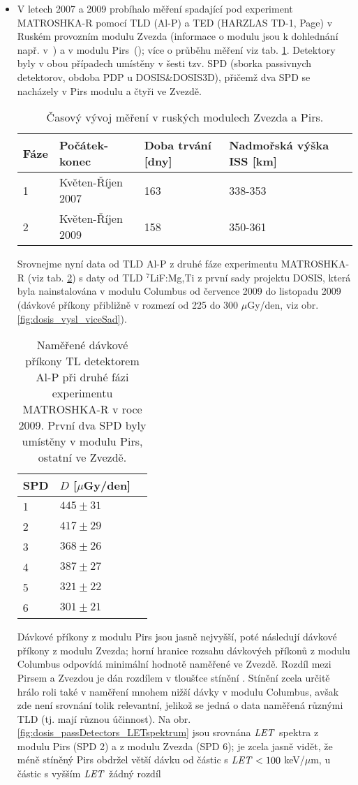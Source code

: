 \begin{itemize}
\item V letech 2007 a 2009 probíhalo měření spadající pod experiment MATROSHKA-R pomocí TLD (Al-P) a TED (HARZLAS TD-1, Page) v Ruském provozním modulu Zvezda (informace o modulu jsou k dohlednání např. v~\cite{serviceModule}) a v modulu Pirs~(\cite{piers1}); více o průběhu měření viz tab. \ref{tab:dosis_passDetectors_timeline}. Detektory byly v obou případech umístěny v šesti tzv. SPD (sborka passivnych detektorov, obdoba PDP u DOSIS\&DOSIS3D), přičemž dva SPD se nacházely v Pirs modulu a čtyři ve Zvezdě. 
\begin{table}[h]
  \centering
  \caption{Časový vývoj měření v ruských modulech Zvezda a Pirs. \cite{passDetectors}}
  \label{tab:dosis_passDetectors_timeline}
  \begin{tabular}{llll}
	\toprule
	Fáze&Počátek-konec&Doba trvání [dny]&Nadmořská výška ISS [km]\\
	\midrule
	1&Květen-Říjen 2007&163&338-353\\
	2&Květen-Říjen 2009&158&350-361\\
	\bottomrule
  \end{tabular}
\end{table}
Srovnejme nyní data od TLD Al-P z druhé fáze experimentu MATROSHKA-R (viz tab. \ref{tab:dosis_passDetectors_vysledky}) s daty od TLD $^7$LiF:Mg,Ti z první sady projektu DOSIS, která byla nainstalována v modulu Columbus od července 2009 do listopadu 2009 (dávkové příkony přibližně v rozmezí od 225 do 300 $\mu$Gy/den, viz obr. \ref{fig:dosis_vysl_viceSad}). 
\begin{table}[h]
  \centering
  \caption{Naměřené dávkové příkony TL detektorem Al-P při druhé fázi experimentu MATROSHKA-R v roce 2009. První dva SPD byly umístěny v modulu Pirs, ostatní ve Zvezdě. \cite{passDetectors}}
  \label{tab:dosis_passDetectors_vysledky}
  \begin{tabular}{lll}
	\toprule
	SPD&$D$ [$\mu$Gy/den]\\
	\midrule
	1&$445\pm31$\\
	2&$417\pm29$\\
	3&$368\pm26$\\
	4&$387\pm27$\\
	5&$321\pm22$\\
	6&$301\pm21$\\
	\bottomrule
  \end{tabular}
\end{table}
Dávkové příkony z modulu Pirs jsou jasně nejvyšší, poté následují dávkové příkony z modulu Zvezda; horní hranice rozsahu dávkových příkonů z modulu Columbus odpovídá minimální hodnotě naměřené ve Zvezdě. Rozdíl mezi Pirsem a Zvezdou je dán rozdílem v tloušťce stínění \cite{passDetectors}. Stínění zcela určitě hrálo roli také v naměření mnohem nižší dávky v modulu Columbus, avšak zde není srovnání tolik relevantní, jelikož se jedná o data naměřená různými TLD (tj. mají různou účinnost). Na obr. \ref{fig:dosis_passDetectors_LETspektrum} jsou srovnána $\mathit{LET}$ spektra z modulu Pirs (SPD 2) a z modulu Zvezda (SPD 6); je zcela jasně vidět, že méně stíněný Pirs obdržel větší dávku od částic s $\mathit{LET}<100$ keV/$\mu$m, u částic s vyšším $\mathit{LET}$ žádný rozdíl

\end{itemize}
